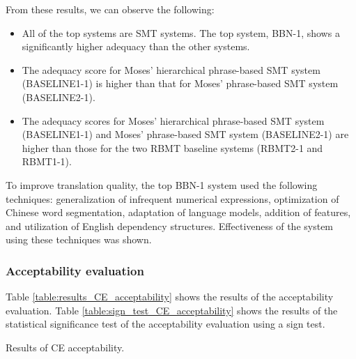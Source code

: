 \documentclass[english]{jnlp_1.4}
\begin{document}
From these results, we can observe the following:
\begin{itemize}
\item All of the top systems are SMT systems. 
The top system, BBN-1, shows a significantly higher adequacy than the other systems. 
\item The adequacy score for Moses' hierarchical phrase-based SMT system (BASELINE1-1) is higher than that for Moses' phrase-based SMT system (BASELINE2-1). 
\item The adequacy scores for Moses' hierarchical phrase-based SMT system (BASELINE1-1) and Moses' phrase-based SMT system (BASELINE2-1) are higher than those for the two RBMT baseline systems (RBMT2-1 and RBMT1-1).
\end{itemize}

\begin{table}[t]
\label{table:sign_test_CE_adequacy}

\end{table}

To improve translation quality, the top BBN-1 system \cite{BBN:NTCIR9} used the following techniques: generalization of infrequent numerical expressions, optimization of Chinese word segmentation, adaptation of language models, addition of features, and utilization of English dependency structures.
Effectiveness of the system using these techniques was shown.


\subsubsection{Acceptability evaluation}

Table \ref{table:results_CE_acceptability} shows the results of the acceptability evaluation. 
Table \ref{table:sign_test_CE_acceptability} shows the results of the statistical significance test of the acceptability evaluation using a sign test.

\begin{table}[t]
\caption{Results of CE acceptability.}
\label{table:results_CE_acceptability}

\end{table}
\begin{table}[t]
\label{table:sign_test_CE_acceptability}

\end{table}
\end{document}
